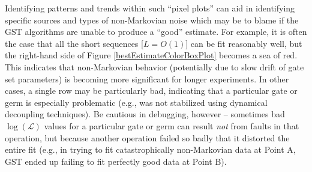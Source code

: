 \documentclass{article}[11pt]
\begin{document}
{Identifying patterns and trends within such ``pixel plots'' can aid in identifying specific sources and types of non-Markovian noise which may be to blame if the GST algorithms are unable to produce a ``good'' estimate.  For example, it is often the case that all the short sequences [$L = O(1)$] can be fit reasonably well, but the right-hand side of Figure \ref{bestEstimateColorBoxPlot} becomes a sea of red.  This indicates that non-Markovian behavior (potentially due to slow drift of gate set parameters) is becoming more significant for longer experiments.  In other cases, a single row may be particularly bad, indicating that a particular gate or germ is especially problematic (e.g., was not stabilized using dynamical decoupling techniques).  Be cautious in debugging, however -- sometimes bad $\log(\mathcal{L})$ values for a particular gate or germ can result \emph{not} from faults in that operation, but because another operation failed so badly that it distorted the entire fit (e.g., in trying to fit catastrophically non-Markovian data at Point A, GST ended up failing to fit perfectly good data at Point B).




}
\end{document}
